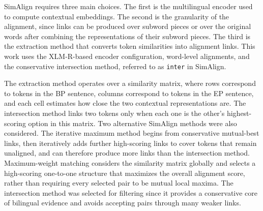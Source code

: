 SimAlign requires three main choices. The first is the multilingual encoder
used to compute contextual embeddings. The second is the granularity of the
alignment, since links can be produced over subword pieces or over the
original words after combining the representations of their subword pieces.
The third is the extraction method that converts token similarities into
alignment links. This work uses the XLM-R-based encoder configuration,
word-level alignments, and the conservative intersection method, referred to
as \texttt{inter} in SimAlign.

The extraction method operates over a similarity matrix, where rows correspond to
tokens in the BP sentence, columns correspond to tokens in the EP sentence, and each
cell estimates how close the two contextual representations are. The
intersection method links two tokens only when each one is the other's
highest-scoring option in this matrix. Two alternative SimAlign methods were
also considered. The iterative maximum method begins from conservative
mutual-best links, then iteratively adds further high-scoring links to cover
tokens that remain unaligned, and can therefore produce more links than the
intersection method. Maximum-weight matching considers the similarity matrix
globally and selects a high-scoring one-to-one structure that maximizes the
overall alignment score, rather than requiring every selected pair to be
mutual local maxima. The intersection method was selected for filtering since
it provides a conservative core of bilingual evidence and avoids accepting
pairs through many weaker links.

